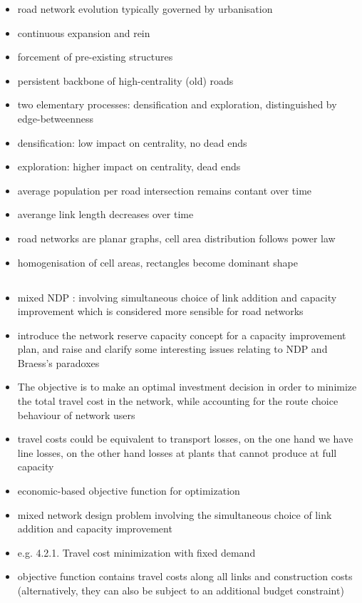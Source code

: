\documentclass[paper=a4, fontsize=12pt]{article}
\begin{document}
\begin{itemize}
\item road network evolution typically governed by urbanisation
\item continuous expansion and rein\item forcement of pre-existing structures
\item persistent backbone of high-centrality (old) roads
\item two elementary processes: densification and exploration, distinguished by edge-betweenness
\item densification: low impact on centrality, no dead ends
\item exploration: higher impact on centrality, dead ends

\item average population per road intersection remains contant over time
\item averange link length decreases over time

\item road networks are planar graphs, cell area distribution follows power law
\item homogenisation of cell areas, rectangles become dominant shape
\end{itemize}

\subsection*{\citeauthor{Yang1998} \cite{Yang1998}}

\begin{itemize}
\item mixed NDP : involving simultaneous choice of link addition and capacity improvement which is considered more sensible for road networks
\item introduce the network reserve capacity concept for a capacity improvement plan, and raise and clarify some interesting issues relating to NDP and Braess's paradoxes

\item The objective is to make an optimal investment decision in order to minimize the total travel cost in the network, while accounting for the route choice behaviour of network users
\item travel costs could be equivalent to transport losses, on the one hand we have line losses, on the other hand losses at plants that cannot produce at full capacity
\item economic-based objective function for optimization
\item mixed network design problem involving the simultaneous choice of link addition and capacity improvement

\item e.g. 4.2.1. Travel cost minimization with fixed demand
\item objective function contains travel costs along all links and construction costs (alternatively, they can also be subject to an additional budget constraint)
\end{itemize}
\end{document}
